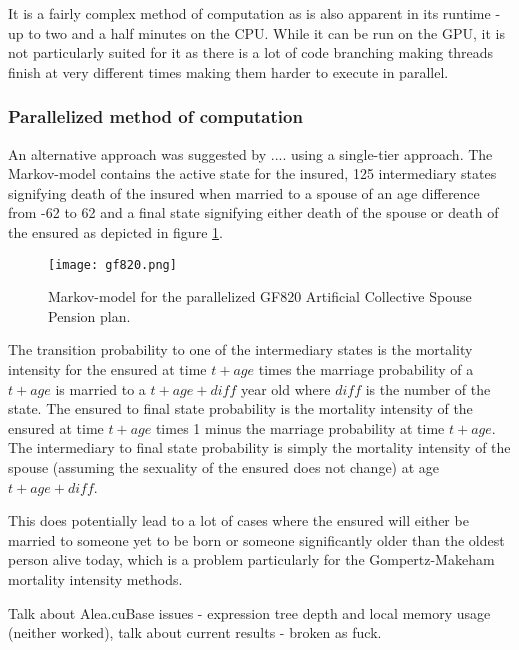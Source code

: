 It is a fairly complex method of computation as is also apparent in its runtime - up to two and a half minutes on the CPU.
While it can be run on the GPU, it is not particularly suited for it as there is a lot of code branching making threads finish at very different times making them harder to execute in parallel.

\subsubsection{Parallelized method of computation}
An alternative approach was suggested by .... using a single-tier approach.
The Markov-model contains the active state for the insured, 125 intermediary states signifying death of the insured when married to a spouse of an age difference from -62 to 62 and a final state signifying either death of the spouse or death of the ensured as depicted in figure \ref{fig:gf820}.

\begin{figure}[h!]\centering
\texttt{[image: gf820.png]}
\caption{Markov-model for the parallelized GF820 Artificial Collective Spouse Pension plan.\label{fig:gf820}}
\end{figure}

The transition probability to one of the intermediary states is the mortality intensity for the ensured at time $t + age$ times the marriage probability of a $t + age$ is married to a $t + age + diff$ year old where $diff$ is the number of the state.
The ensured to final state probability is the mortality intensity of the ensured at time $t + age$ times 1 minus the marriage probability at time $t + age$.
The intermediary to final state probability is simply the mortality intensity of the spouse (assuming the sexuality of the ensured does not change) at age $t + age + diff$.

This does potentially lead to a lot of cases where the ensured will either be married to someone yet to be born or someone significantly older than the oldest person alive today, which is a problem particularly for the Gompertz-Makeham mortality intensity methods. 


Talk about Alea.cuBase issues - expression tree depth and local memory usage (neither worked), talk about current results - broken as fuck.
